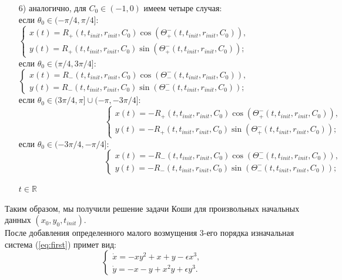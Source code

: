 \documentclass{article}
\begin{document}
\begin{enumerate}
\item[{6)}] аналогично, для $C_0\in(-1,0)$ имеем четыре случая:\\
если $\theta_0 \in (-\pi/4, \pi/4]$:
$ \begin{cases}
       x(t) = R_+(t,t_{init}, r_{init}, C_0)\cos(\Theta^-_+(t,t_{init},r_{init},C_0)),\\
       y(t) = R_+(t,t_{init}, r_{init}, C_0)\sin(\Theta^-_+(t,t_{init},r_{init},C_0));
\end{cases}$ \\
если $\theta_0 \in (\pi/4, 3\pi/4]$:
$ \begin{cases}
       x(t) = R_-(t,t_{init}, r_{init}, C_0)\cos(\Theta^-_-(t,t_{init},r_{init},C_0)),\\
       y(t) = R_-(t,t_{init}, r_{init}, C_0)\sin(\Theta^-_-(t,t_{init},r_{init},C_0));
\end{cases}$ \\
если $ \theta_0 \in (3\pi/4, \pi]\cup(-\pi, -3\pi/4]$:\\
$\hspace{125pt} \begin{cases}
       x(t) = -R_+(t,t_{init}, r_{init}, C_0)\cos(\Theta^-_+(t,t_{init},r_{init},C_0)),\\
       y(t) = -R_+(t,t_{init}, r_{init}, C_0)\sin(\Theta^-_+(t,t_{init},r_{init},C_0));
\end{cases}$ \\
если $\theta_0 \in (-3\pi/4, -\pi/4]$:\\
$\hspace{125pt} \begin{cases}
       x(t) = -R_-(t,t_{init}, r_{init}, C_0)\cos(\Theta^-_-(t,t_{init},r_{init},C_0)),\\
       y(t) = -R_-(t,t_{init}, r_{init}, C_0)\sin(\Theta^-_-(t,t_{init},r_{init},C_0));
\end{cases}$ \\
\begin{center}
    $t\in \mathbb{R}$
\end{center}
\end{enumerate}

Таким образом, мы получили решение задачи Коши для произвольных начальных данных $(x_0, y_0, t_{init})$.\\

После добавления определенного малого возмущения 3-его порядка изначальная система (\ref{eq:first}) примет вид:
\begin{equation}
\begin{cases}
      \dot x=-xy^2+x+y-\epsilon x^3,\\
      \dot y=-x-y+x^2y+\epsilon y^3.
    \end{cases}
    \label{eq:second}
\end{equation}
\end{document}
